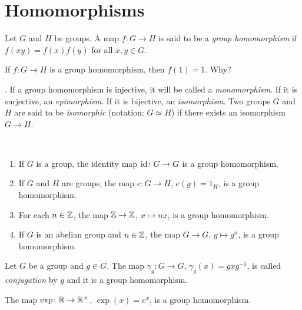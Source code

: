 \section{Homomorphisms}

\begin{definition}
        Let $G$ and $H$ be groups. 
        A map $f\colon G\to H$ is said to be a 
        \emph{group homomorphism} if 
        $f(xy)=f(x)f(y)$ for all $x,y\in G$.
\end{definition}

If $f\colon G\to H$ is a group homomorphism, 
then $f(1)=1$. Why? 

.
If a group homomorphism is injective, it will be called
a \emph{monomorphism}. If it is surjective, 
an \emph{epimorphism}. If it is bijective, 
an \emph{isomorphism}. Two groups $G$ and $H$ 
are said to be \emph{isomorphic} (notation: $G\simeq H$)
if there exists an isomorphism $G\to H$.

\begin{example}\
\begin{enumerate}
\item If $G$ is a group, the identity map $\operatorname{id}\colon G\to G$ is a group
homomorphism. 
\item If $G$ and $H$ are groups, the map $e\colon G\to H$, $e(g)=1_H$,  is a group homomorphism. 
\item For each $n\in\mathbb{Z}$, the map $\mathbb{Z}\to\mathbb{Z}$, $x\mapsto nx$, is a group homomorphism. 
\item If $G$ is an abelian group and $n\in\mathbb{Z}$, the map $G\to G$, $g\mapsto g^n$, is a group
homomorphism. 
\end{enumerate}
\end{example}

\begin{example}
Let $G$ be a group and $g\in G$. The map $\gamma_g\colon G\to G$, $\gamma_g(x)=gxg^{-1}$, is called 
\emph{conjugation} by $g$ and it is a group homomorphism. 
\end{example}

\begin{example}
The map $\exp\colon\mathbb{R}\to\mathbb{R}^\times$, $\exp(x)=e^x$, is a group homomorphism. 
\end{example}


